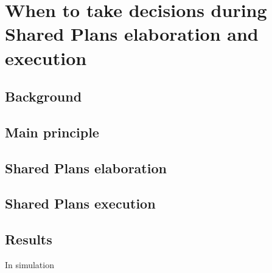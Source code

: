\documentclass[english,a4paper,11pt,twoside]{StyleThese}
\begin{document}
\setcounter{chapter}{3} %
\dominitoc
\faketableofcontents
\fi

\chapter{When to take decisions during Shared Plans elaboration and execution}
\minitoc

\section{Background}

\section{Main principle}

\section{Shared Plans elaboration}

\section{Shared Plans execution}

\section{Results}

In simulation

\ifdefined{}
\else


\end{document}

